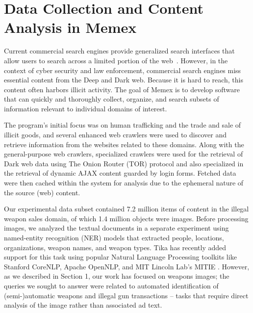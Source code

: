 \section{Data Collection and Content Analysis in Memex}
\label{sec:memex-data}
Current commercial search engines provide generalized search interfaces that allow users to search across a limited portion of the web~\cite{fbo-memex}. However, in the context of cyber security and law enforcement, commercial search engines miss essential content from the Deep and Dark web. Because it is hard to reach, this content often harbors illicit activity. The goal of Memex is to develop software that can quickly and thoroughly collect, organize, and search subsets of information relevant to individual domains of interest. 

The program's initial focus was on human trafficking and the trade and sale of illicit goods, and several enhanced web crawlers were used to discover and retrieve information from the websites related to these domains. Along with the general-purpose web crawlers, specialized crawlers were used for the retrieval of Dark web data using The Onion Router (TOR) protocol \cite{mentor2016onion} and also specialized in the retrieval of dynamic AJAX content guarded by login forms. Fetched data were then cached within the system for analysis due to the ephemeral nature of the source (web) content.

Our experimental data subset contained 7.2 million items of content in the illegal weapon sales domain, of which 1.4 million objects were images. Before processing images, we analyzed the textual documents in a separate experiment using named-entity recognition (NER) models that extracted people, locations, organizations, weapon names, and weapon types. Tika has recently added support for this task using popular Natural Language Processing toolkits like Stanford CoreNLP\cite{Finkel:2005:INI:1219840.1219885}, Apache OpenNLP\cite{ApacheOpenNLP}, and MIT Lincoln Lab's MITIE \cite{MITIE-github}. However, as we described in Section 1, our work has focused on weapons images; the queries we sought to answer were related to automated identification of (semi-)automatic weapons and illegal gun transactions -- tasks that require direct analysis of the image rather than associated ad text.

